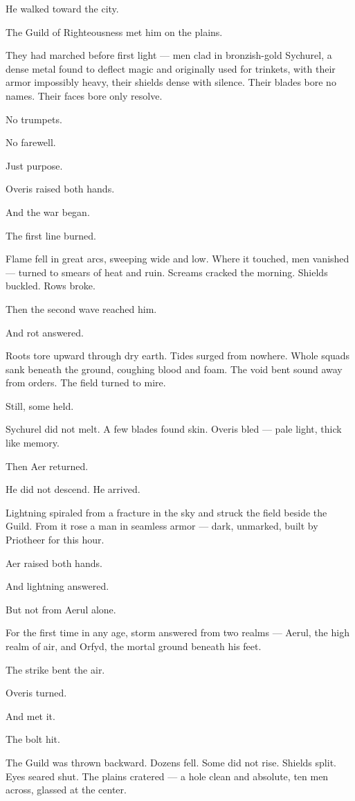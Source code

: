 \documentclass[9pt]{article}
\begin{document}
He walked toward the city.

The Guild of Righteousness met him on the plains.

They had marched before first light — men clad in bronzish-gold Sychurel, a dense metal found to deflect magic and originally used for trinkets, with their armor impossibly heavy, their shields dense with silence. Their blades bore no names. Their faces bore only resolve.

No trumpets.

No farewell.

Just purpose.

Overis raised both hands.

And the war began.

The first line burned.

Flame fell in great arcs, sweeping wide and low. Where it touched, men vanished — turned to smears of heat and ruin. Screams cracked the morning. Shields buckled. Rows broke.

Then the second wave reached him.

And rot answered.

Roots tore upward through dry earth. Tides surged from nowhere. Whole squads sank beneath the ground, coughing blood and foam. The void bent sound away from orders. The field turned to mire.

Still, some held.

Sychurel did not melt. A few blades found skin. Overis bled — pale light, thick like memory.

Then Aer returned.

He did not descend. He arrived.

Lightning spiraled from a fracture in the sky and struck the field beside the Guild. From it rose a man in seamless armor — dark, unmarked, built by Priotheer for this hour.

Aer raised both hands.

And lightning answered.

But not from Aerul alone.

For the first time in any age, storm answered from two realms — Aerul, the high realm of air, and Orfyd, the mortal ground beneath his feet.

The strike bent the air.

Overis turned.

And met it.

The bolt hit.

The Guild was thrown backward. Dozens fell. Some did not rise. Shields split. Eyes seared shut. The plains cratered — a hole clean and absolute, ten men across, glassed at the center.
\end{document}
